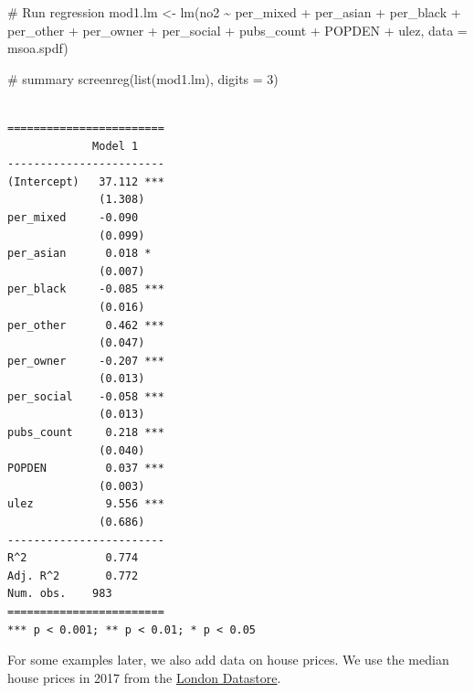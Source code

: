 \documentclass[
  letterpaper,
]{scrbook}
\newenvironment{Shaded}{\begin{snugshade}}{\end{snugshade}}
\newcommand{\AttributeTok}[1]{\textcolor[rgb]{0.40,0.45,0.13}{#1}}
\newcommand{\CommentTok}[1]{\textcolor[rgb]{0.37,0.37,0.37}{#1}}
\newcommand{\DecValTok}[1]{\textcolor[rgb]{0.68,0.00,0.00}{#1}}
\newcommand{\FunctionTok}[1]{\textcolor[rgb]{0.28,0.35,0.67}{#1}}
\newcommand{\NormalTok}[1]{\textcolor[rgb]{0.00,0.23,0.31}{#1}}
\newcommand{\OtherTok}[1]{\textcolor[rgb]{0.00,0.23,0.31}{#1}}
\newcommand{\SpecialCharTok}[1]{\textcolor[rgb]{0.37,0.37,0.37}{#1}}
\newcommand{\StringTok}[1]{\textcolor[rgb]{0.13,0.47,0.30}{#1}}
\begin{document}
\begin{Shaded}
\begin{Highlighting}[]
\CommentTok{\# Run regression}
\NormalTok{mod1.lm }\OtherTok{\textless{}{-}} \FunctionTok{lm}\NormalTok{(no2 }\SpecialCharTok{\textasciitilde{}}\NormalTok{ per\_mixed }\SpecialCharTok{+}\NormalTok{ per\_asian }\SpecialCharTok{+}\NormalTok{ per\_black }\SpecialCharTok{+}\NormalTok{ per\_other }\SpecialCharTok{+}
\NormalTok{                per\_owner }\SpecialCharTok{+}\NormalTok{ per\_social }\SpecialCharTok{+}\NormalTok{ pubs\_count }\SpecialCharTok{+}\NormalTok{ POPDEN }\SpecialCharTok{+}\NormalTok{ ulez,}
              \AttributeTok{data =}\NormalTok{ msoa.spdf)}

\CommentTok{\# summary}
\FunctionTok{screenreg}\NormalTok{(}\FunctionTok{list}\NormalTok{(mod1.lm), }\AttributeTok{digits =} \DecValTok{3}\NormalTok{)}
\end{Highlighting}
\end{Shaded}

\begin{verbatim}

========================
             Model 1    
------------------------
(Intercept)   37.112 ***
              (1.308)   
per_mixed     -0.090    
              (0.099)   
per_asian      0.018 *  
              (0.007)   
per_black     -0.085 ***
              (0.016)   
per_other      0.462 ***
              (0.047)   
per_owner     -0.207 ***
              (0.013)   
per_social    -0.058 ***
              (0.013)   
pubs_count     0.218 ***
              (0.040)   
POPDEN         0.037 ***
              (0.003)   
ulez           9.556 ***
              (0.686)   
------------------------
R^2            0.774    
Adj. R^2       0.772    
Num. obs.    983        
========================
*** p < 0.001; ** p < 0.01; * p < 0.05
\end{verbatim}

For some examples later, we also add data on house prices. We use the
median house prices in 2017 from the
\href{https://data.london.gov.uk/dataset/average-house-prices}{London
Datastore}.

\begin{Shaded}
\end{Shaded}
\end{document}
